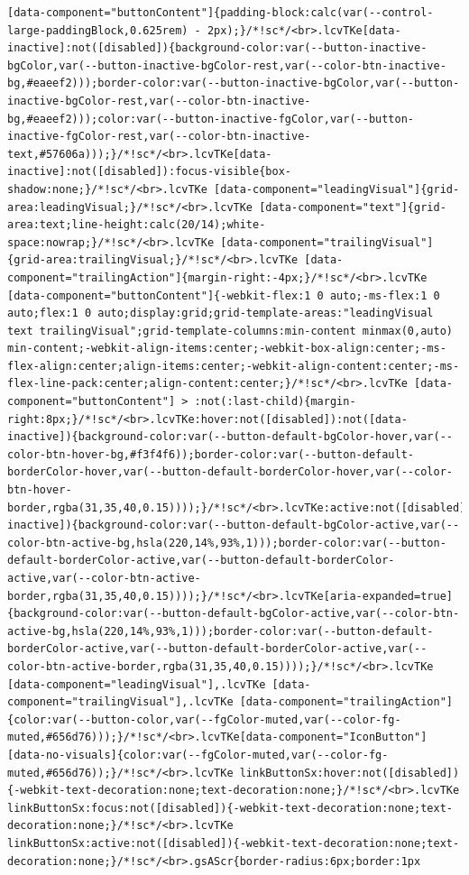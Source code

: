 \documentclass[
  letterpaper,
]{book}
\begin{document}
\begin{verbatim}
[data-component="buttonContent"]{padding-block:calc(var(--control-large-paddingBlock,0.625rem) - 2px);}/*!sc*/<br>.lcvTKe[data-inactive]:not([disabled]){background-color:var(--button-inactive-bgColor,var(--button-inactive-bgColor-rest,var(--color-btn-inactive-bg,#eaeef2)));border-color:var(--button-inactive-bgColor,var(--button-inactive-bgColor-rest,var(--color-btn-inactive-bg,#eaeef2)));color:var(--button-inactive-fgColor,var(--button-inactive-fgColor-rest,var(--color-btn-inactive-text,#57606a)));}/*!sc*/<br>.lcvTKe[data-inactive]:not([disabled]):focus-visible{box-shadow:none;}/*!sc*/<br>.lcvTKe [data-component="leadingVisual"]{grid-area:leadingVisual;}/*!sc*/<br>.lcvTKe [data-component="text"]{grid-area:text;line-height:calc(20/14);white-space:nowrap;}/*!sc*/<br>.lcvTKe [data-component="trailingVisual"]{grid-area:trailingVisual;}/*!sc*/<br>.lcvTKe [data-component="trailingAction"]{margin-right:-4px;}/*!sc*/<br>.lcvTKe [data-component="buttonContent"]{-webkit-flex:1 0 auto;-ms-flex:1 0 auto;flex:1 0 auto;display:grid;grid-template-areas:"leadingVisual text trailingVisual";grid-template-columns:min-content minmax(0,auto) min-content;-webkit-align-items:center;-webkit-box-align:center;-ms-flex-align:center;align-items:center;-webkit-align-content:center;-ms-flex-line-pack:center;align-content:center;}/*!sc*/<br>.lcvTKe [data-component="buttonContent"] > :not(:last-child){margin-right:8px;}/*!sc*/<br>.lcvTKe:hover:not([disabled]):not([data-inactive]){background-color:var(--button-default-bgColor-hover,var(--color-btn-hover-bg,#f3f4f6));border-color:var(--button-default-borderColor-hover,var(--button-default-borderColor-hover,var(--color-btn-hover-border,rgba(31,35,40,0.15))));}/*!sc*/<br>.lcvTKe:active:not([disabled]):not([data-inactive]){background-color:var(--button-default-bgColor-active,var(--color-btn-active-bg,hsla(220,14%,93%,1)));border-color:var(--button-default-borderColor-active,var(--button-default-borderColor-active,var(--color-btn-active-border,rgba(31,35,40,0.15))));}/*!sc*/<br>.lcvTKe[aria-expanded=true]{background-color:var(--button-default-bgColor-active,var(--color-btn-active-bg,hsla(220,14%,93%,1)));border-color:var(--button-default-borderColor-active,var(--button-default-borderColor-active,var(--color-btn-active-border,rgba(31,35,40,0.15))));}/*!sc*/<br>.lcvTKe [data-component="leadingVisual"],.lcvTKe [data-component="trailingVisual"],.lcvTKe [data-component="trailingAction"]{color:var(--button-color,var(--fgColor-muted,var(--color-fg-muted,#656d76)));}/*!sc*/<br>.lcvTKe[data-component="IconButton"][data-no-visuals]{color:var(--fgColor-muted,var(--color-fg-muted,#656d76));}/*!sc*/<br>.lcvTKe linkButtonSx:hover:not([disabled]){-webkit-text-decoration:none;text-decoration:none;}/*!sc*/<br>.lcvTKe linkButtonSx:focus:not([disabled]){-webkit-text-decoration:none;text-decoration:none;}/*!sc*/<br>.lcvTKe linkButtonSx:active:not([disabled]){-webkit-text-decoration:none;text-decoration:none;}/*!sc*/<br>.gsAScr{border-radius:6px;border:1px 
\end{verbatim}
\end{document}
